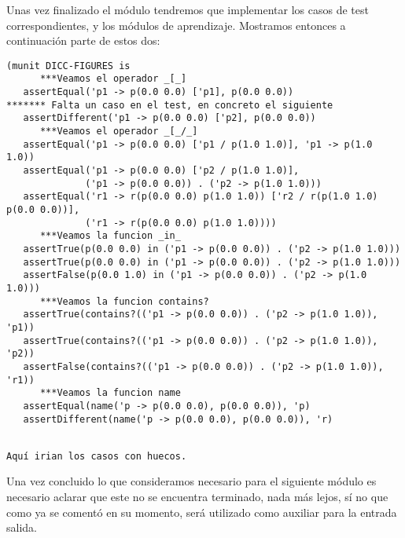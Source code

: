 Unas vez finalizado el módulo tendremos que implementar los casos de test correspondientes, y los módulos de aprendizaje. Mostramos entonces a continuación parte de estos dos: \par

{\codesize
\begin{verbatim}
(munit DICC-FIGURES is
      ***Veamos el operador _[_]
   assertEqual('p1 -> p(0.0 0.0) ['p1], p(0.0 0.0))
******* Falta un caso en el test, en concreto el siguiente
   assertDifferent('p1 -> p(0.0 0.0) ['p2], p(0.0 0.0))
      ***Veamos el operador _[_/_]
   assertEqual('p1 -> p(0.0 0.0) ['p1 / p(1.0 1.0)], 'p1 -> p(1.0 1.0))
   assertEqual('p1 -> p(0.0 0.0) ['p2 / p(1.0 1.0)], 
              ('p1 -> p(0.0 0.0)) . ('p2 -> p(1.0 1.0)))
   assertEqual('r1 -> r(p(0.0 0.0) p(1.0 1.0)) ['r2 / r(p(1.0 1.0) p(0.0 0.0))], 
              ('r1 -> r(p(0.0 0.0) p(1.0 1.0))))
      ***Veamos la funcion _in_
   assertTrue(p(0.0 0.0) in ('p1 -> p(0.0 0.0)) . ('p2 -> p(1.0 1.0)))
   assertTrue(p(0.0 0.0) in ('p1 -> p(0.0 0.0)) . ('p2 -> p(1.0 1.0)))
   assertFalse(p(0.0 1.0) in ('p1 -> p(0.0 0.0)) . ('p2 -> p(1.0 1.0)))
      ***Veamos la funcion contains?
   assertTrue(contains?(('p1 -> p(0.0 0.0)) . ('p2 -> p(1.0 1.0)), 'p1))
   assertTrue(contains?(('p1 -> p(0.0 0.0)) . ('p2 -> p(1.0 1.0)), 'p2))
   assertFalse(contains?(('p1 -> p(0.0 0.0)) . ('p2 -> p(1.0 1.0)), 'r1))
      ***Veamos la funcion name
   assertEqual(name('p -> p(0.0 0.0), p(0.0 0.0)), 'p)
   assertDifferent(name('p -> p(0.0 0.0), p(0.0 0.0)), 'r)
\end{verbatim}
}

{\codesize
\begin{verbatim}

Aquí irian los casos con huecos.

\end{verbatim}
}

Una vez concluido lo que consideramos necesario para el siguiente módulo es necesario aclarar que este no se encuentra terminado, nada más lejos, sí no que como ya se comentó en su momento, será utilizado como auxiliar para la entrada salida.
